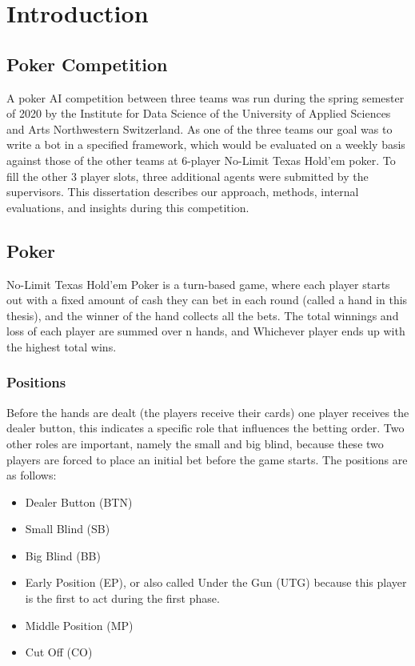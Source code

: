 \chapter{Introduction}
\section{Poker Competition}
A poker AI competition between three teams was run during the spring semester of 2020 by the Institute for Data Science of the University of Applied Sciences and Arts Northwestern Switzerland. As one of the three teams our goal was to write a bot in a specified framework, which would be evaluated on a weekly basis against those of the other teams at 6-player No-Limit Texas Hold'em poker. To fill the other 3 player slots, three additional agents were submitted by the supervisors. This dissertation describes our approach, methods, internal evaluations, and insights during this competition.

\section{Poker}
No-Limit Texas Hold'em Poker is a turn-based game, where each player starts out with a fixed amount of cash they can bet in each round (called a hand in this thesis), and the winner of the hand collects all the bets. The total winnings and loss of each player are summed over n hands, and Whichever player ends up with the highest total wins.


\subsection{Positions}
Before the hands are dealt (the players receive their cards) one player receives the dealer button, this indicates a specific role that influences the betting order. Two other roles are important, namely the small and big blind, because these two players are forced to place an initial bet before the game starts. The positions are as follows:
\begin{itemize}
    \item Dealer Button (BTN)
    \item Small Blind (SB)
    \item Big Blind (BB)
    \item Early Position (EP), or also called Under the Gun (UTG) because this player is the first to act during the first phase.
    \item Middle Position (MP)
    \item Cut Off (CO)
\end{itemize}

